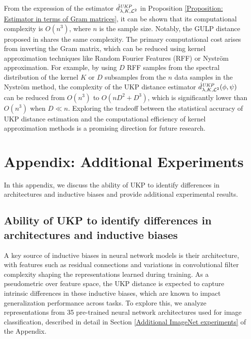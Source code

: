 \documentclass{article} %
\newcommand{\metricstname}{UKP }
\newcommand{\dtwohat}{\hat{d}_{\lambda,K,\mathcal{L}^{2}}^{\emph{\metricstname}}}
\theoremstyle{plain}
\begin{document}
From the expression of the estimator $\dtwohat$ in Proposition \ref{Proposition: Estimator in terms of Gram matrices}, it can be shown that its computational complexity is $O(n^3)$, where $n$ is the sample size. Notably, the GULP distance proposed in \citet{GULP} shares the same complexity. The primary computational cost arises from inverting the Gram matrix, which can be reduced using kernel approximation techniques like Random Fourier Features (RFF) or Nystr\"{o}m approximation. For example, by using $D$ RFF samples from the spectral distribution of the kernel $K$ or $D$ subsamples from the $n$ data samples in the Nystr\"{o}m method, the complexity of the UKP distance estimator $\dtwohat(\phi,\psi)$ can be reduced from $O(n^3)$ to $O(nD^{2} + D^{3})$, which is significantly lower than $O(n^3)$ when $D \ll n$. Exploring the tradeoff between the statistical accuracy of \metricstname distance estimation and the computational efficiency of kernel approximation methods is a promising direction for future research.

\newpage

\section{Appendix: Additional Experiments}
In this appendix, we discuss the ability of \metricstname to identify differences in architectures and inductive biases and provide additional experimental results.

\subsection{Ability of \metricstname to identify differences in architectures and inductive biases} \label{ImageNet experiments experiments}
 A key source of inductive biases in neural network models is their architecture, with features such as residual connections and variations in convolutional filter complexity shaping the representations learned during training. As a pseudometric over feature space, the \metricstname distance is expected to capture intrinsic differences in these inductive biases, which are known to impact generalization performance across tasks. To explore this, we analyze representations from 35 pre-trained neural network architectures used for image classification, described in detail in Section \ref{Additional ImageNet experiments} of the Appendix.
\end{document}
